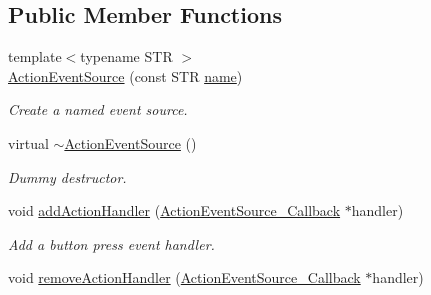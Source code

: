 \subsection*{Public Member Functions}
\begin{DoxyCompactItemize}
\item 
\hypertarget{classGUI_1_1ActionEventSource_a635659bd7a7964d6d1b450d1d353736e}{{\footnotesize template$<$typename S\-T\-R $>$ }\\\hyperlink{classGUI_1_1ActionEventSource_a635659bd7a7964d6d1b450d1d353736e}{Action\-Event\-Source} (const S\-T\-R \hyperlink{classGUI_1_1ActionEventSource_ab494e66ccff6518e1cabe747df2173f8}{name})}\label{classGUI_1_1ActionEventSource_a635659bd7a7964d6d1b450d1d353736e}

\begin{DoxyCompactList}\small\item\em Create a named event source. \end{DoxyCompactList}\item 
\hypertarget{classGUI_1_1ActionEventSource_affe36df419783630e2b3ddd8440cb213}{virtual \hyperlink{classGUI_1_1ActionEventSource_affe36df419783630e2b3ddd8440cb213}{$\sim$\-Action\-Event\-Source} ()}\label{classGUI_1_1ActionEventSource_affe36df419783630e2b3ddd8440cb213}

\begin{DoxyCompactList}\small\item\em Dummy destructor. \end{DoxyCompactList}\item 
\hypertarget{classGUI_1_1ActionEventSource_afe087d143e90df22003cafb7b278315e}{void \hyperlink{classGUI_1_1ActionEventSource_afe087d143e90df22003cafb7b278315e}{add\-Action\-Handler} (\hyperlink{structGUI_1_1ActionEventSource__Callback}{Action\-Event\-Source\-\_\-\-Callback} $\ast$handler)}\label{classGUI_1_1ActionEventSource_afe087d143e90df22003cafb7b278315e}

\begin{DoxyCompactList}\small\item\em Add a button press event handler. \end{DoxyCompactList}\item 
\hypertarget{classGUI_1_1ActionEventSource_a9b075e6c866d20cd5872b2c1af99472a}{void \hyperlink{classGUI_1_1ActionEventSource_a9b075e6c866d20cd5872b2c1af99472a}{remove\-Action\-Handler} (\hyperlink{structGUI_1_1ActionEventSource__Callback}{Action\-Event\-Source\-\_\-\-Callback} $\ast$handler)}\label{classGUI_1_1ActionEventSource_a9b075e6c866d20cd5872b2c1af99472a}


\end{DoxyCompactItemize}
